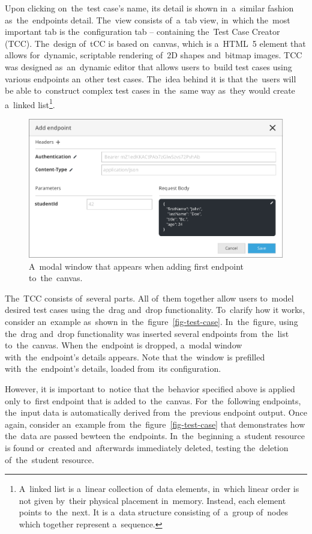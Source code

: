 Upon clicking on~the~test case's name, its detail is shown in~a~similar fashion as~the~endpoints detail.
The~view consists of~a~tab view, in~which the~most important tab is the~configuration tab -- containing
the~Test Case Creator (TCC). The~design of~tCC is based on~canvas, which is a~HTML~5 element that allows
for~dynamic, scriptable rendering of~2D shapes and~bitmap images. TCC was designed as~an~dynamic editor that
allows users to~build test cases using various endpoints an~other test cases. The~idea behind it is that the~users
will be able to~construct complex test cases in~the~same way as~they would create a~linked list\footnote{
A~linked list is a~linear collection of~data elements, in~which linear order is not given by~their
physical placement in~memory. Instead, each element points to~the~next. It is a~data structure
consisting of~a~group of~nodes which together represent a~sequence.}.

\begin{figure}[!hbt]
	\centering
	\includegraphics[scale=0.7]{./designs/add-endpoint.pdf}
	\caption{A~modal window that appears when adding first endpoint to~the~canvas.}
	\label{fig-add-endpoint}
\end{figure}

The~TCC consists of~several parts. All of~them together allow users to~model desired
test cases using the~drag and~drop functionality. To~clarify how it works, consider an~example
as~shown in~the~figure~\ref{fig-test-case}. In~the~figure, using the~drag and~drop functionality was
inserted several endpoints from~the~list to~the~canvas. When the~endpoint is dropped, a~modal window
with~the~endpoint's details appears. Note that the~window is prefilled with~the~endpoint's details,
loaded from~its configuration.

However, it is important to~notice that the~behavior specified above is applied only to~first
endpoint that is added to~the~canvas. For~the~following endpoints, the~input data is
automatically derived from~the~previous endpoint output. Once again, consider an~example
from~the~figure~\ref{fig-test-case} that demonstrates how the~data are passed bewteen the~endpoints.
In~the~beginning a~student resource is found or~created and~afterwards immediately deleted, testing 
the~deletion of~the~student resource.

